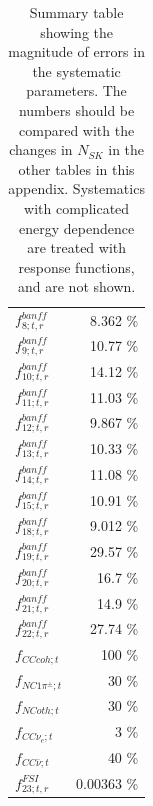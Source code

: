 \begin{table}[b]
\begin{tabular}{| l | r |}
                                                           $f_{8; t, r}^{banff}$ &           8.362 \%  \\ 
                                                           $f_{9; t, r}^{banff}$ &           10.77 \%  \\ 
                                                          $f_{10; t, r}^{banff}$ &           14.12 \%  \\ 
                                                          $f_{11; t, r}^{banff}$ &           11.03 \%  \\ 
                                                          $f_{12; t, r}^{banff}$ &           9.867 \%  \\ 
                                                          $f_{13; t, r}^{banff}$ &           10.33 \%  \\ 
                                                          $f_{14; t, r}^{banff}$ &           11.08 \%  \\ 
                                                          $f_{15; t, r}^{banff}$ &           10.91 \%  \\ 
                                                          $f_{18; t, r}^{banff}$ &           9.012 \%  \\ 
                                                          $f_{19; t, r}^{banff}$ &           29.57 \%  \\ 
                                                          $f_{20; t, r}^{banff}$ &            16.7 \%  \\ 
                                                          $f_{21; t, r}^{banff}$ &            14.9 \%  \\ 
                                                          $f_{22; t, r}^{banff}$ &           27.74 \%  \\ 
                                                                  $f_{CCcoh; t}$ &             100 \%  \\ 
                                                             $f_{NC1\pi^\pm; t}$ &              30 \%  \\ 
                                                                  $f_{NCoth; t}$ &              30 \%  \\ 
                                                                $f_{CC\nu_e; t}$ &               3 \%  \\ 
                                                            $f_{CC\bar{\nu}; t}$ &              40 \%  \\ 
                                                            $f_{23; t, r}^{FSI}$ &         0.00363 \%  \\ 
\hline
\end{tabular}
\caption{Summary table showing the magnitude of errors in the systematic parameters. The numbers should be compared with the 
changes in $N_{SK}$ in the other tables in this appendix. Systematics with complicated energy dependence are treated with 
response functions, and are not shown.}
\label{tab:nsk_expectations}
\end{table}
